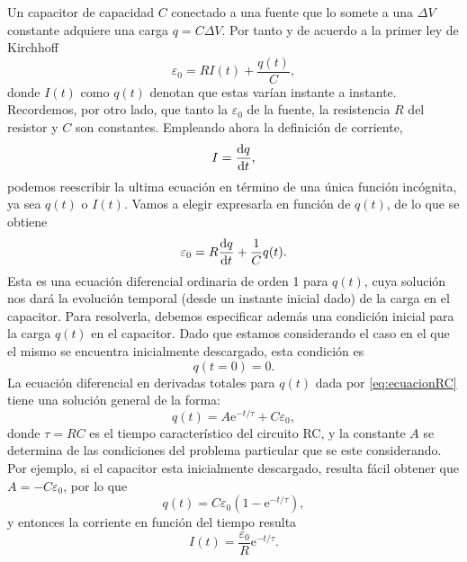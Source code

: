 \documentclass[laboratorio]{guia}
\begin{document}



Un capacitor de capacidad \(C\) conectado a una fuente que lo somete a una $\Delta V$ constante adquiere una carga $q = C \Delta V$.
Por tanto y de acuerdo a la primer ley de Kirchhoff
\begin{equation}
    \varepsilon_0 = RI(t) + \frac{q(t)}{C},
\end{equation}
donde  \(I(t)\) como \(q(t)\) denotan que estas varían instante a instante.
Recordemos, por otro lado, que tanto la $\varepsilon_0$ de la fuente, la resistencia \(R\) del resistor y $C$ son constantes.
Empleando ahora la definición de corriente,
\begin{equation}
  I = \dv{q}{t},
  \label{corriente}
\end{equation}
podemos reescribir la ultima ecuación en término de una única función incógnita, ya sea \(q(t)\) o \(I(t)\).
Vamos a elegir expresarla en función de \(q(t)\), de lo que se obtiene
\begin{equation}
    \varepsilon_0 = R \dv{q}{t}(t) + \frac{1}{C} q(t).
    \label{eq:ecuacionRC}
\end{equation}
Esta es una ecuación diferencial ordinaria de orden 1 para \(q(t)\), cuya solución nos dará la evolución temporal (desde un instante inicial dado) de la carga en el capacitor. 
Para resolverla, debemos especificar además una condición inicial para la carga \(q(t)\) en el capacitor.
Dado que estamos considerando el caso en el que el mismo se encuentra inicialmente descargado, esta condición es
\begin{equation}
    q(t=0) = 0.
\end{equation}
La ecuación diferencial en derivadas totales para \(q(t)\) dada por
\eqref{eq:ecuacionRC} tiene una solución general de la forma:
\begin{equation}
    q(t) = A \text{e}^{-t/\tau} + C \varepsilon_0,
\end{equation}
donde \(\tau = RC\) es el tiempo característico del circuito RC, y la constante \(A\) se determina de las condiciones del problema particular que se este considerando.
Por ejemplo, si el capacitor esta inicialmente descargado, resulta fácil obtener que \(A = -C \varepsilon_0\), por lo que
\begin{equation}
    q(t) = C \varepsilon_0 \left(1 - \text{e}^{-t/\tau} \right),
\end{equation}
y entonces la corriente en función del tiempo resulta
\begin{equation}
    I(t) = \frac{\varepsilon_0}{R} \text{e}^{-t/\tau}.
\end{equation}
\end{document}
